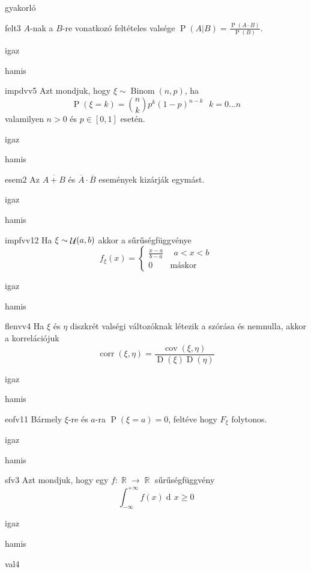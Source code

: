 \documentclass[12pt]{article}
\DeclareMathOperator{\Binom}{Binom}
\DeclareMathOperator{\D}{D}
\renewcommand{\P}{\operatorname{P}}
\DeclareMathOperator{\corr}{corr}
\renewcommand{\d}{\operatorname{d\! }} %
\DeclareMathOperator{\R}{\mathbb{R}}
\DeclareMathOperator{\Unif}{{\cal U}}
\DeclareMathOperator{\cov}{cov}
\begin{document}
\begin{quiz}{gyakorló}

\begin{multi}{felt3}
$A$-nak a $B$-re vonatkozó feltételes valsége $\P(A|B)=\frac{\P(A\cdot B)}{\P(B)}$.
\item igaz
\item* hamis
\end{multi}
\begin{multi}{impdvv5}
Azt mondjuk, hogy $\xi\sim \Binom(n,p)$, ha 
$$
\P(\xi=k)=\binom{n}{k}p^k(1-p)^{n-k}\ \ \ k=0\ldots n
$$
valamilyen $n>0$ és $p\in[0,1]$ esetén.
\item* igaz
\item hamis
\end{multi}
\begin{multi}{esem2}
Az $\overline{A+B}$ és $\overline{A} \cdot \overline{B}$ események kizárják egymást.
\item igaz
\item* hamis
\end{multi}
\begin{multi}{impfvv12}
Ha $\xi\sim \Unif(a,b)$ akkor a sűrűségfüggvénye 
$$
f_{\xi}(x)=
\begin{cases}
\frac{x-a}{b-a} & \ \ a<x<b \\
0 & \text{máskor} 
\end{cases}
$$
\item igaz
\item* hamis
\end{multi}
\begin{multi}{flenvv4}
Ha $\xi$ és $\eta$ diszkrét valségi változóknak létezik a szórása és nemnulla, akkor a 
korrelációjuk
$$
\corr(\xi,\eta)=\frac{\cov(\xi,\eta)}{\D(\xi)\D(\eta)}
$$
\item* igaz
\item hamis
\end{multi}
\begin{multi}{eofv11}
Bármely $\xi$-re és $a$-ra $\P(\xi= a)=0$, feltéve hogy $F_{\xi}$ folytonos.
\item* igaz
\item hamis
\end{multi}
\begin{multi}{sfv3}
Azt mondjuk, hogy egy $f:\R\to \R$ sűrűségfüggvény 
$$
\int_{-\infty}^{+\infty}f(x)\d x\ge 0
$$
\item igaz
\item* hamis
\end{multi}
\begin{multi}{val4}

\end{multi}
\end{quiz}
\end{document}
